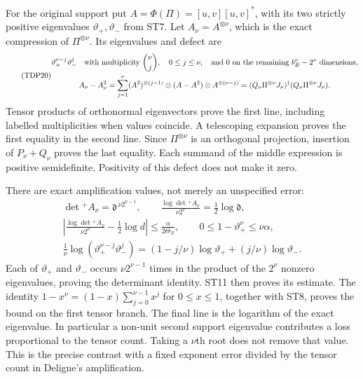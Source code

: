 For the original support put $A=\Phi(\Pi)=[u,v][u,v]^*$, with its two
strictly positive eigenvalues $\vartheta_+,\vartheta_-$ from ST7. Let
$A_\nu=A^{\otimes\nu}$, which is the exact compression of
$\Pi^{\otimes\nu}$. Its eigenvalues and defect are
\begin{equation}\tag{TDP20}
\begin{gathered}
\vartheta_+^{\nu-j}\vartheta_-^j
 \quad\hbox{with multiplicity }{\nu\choose j},\quad 0\le j\le\nu,
 \quad\hbox{and }0\hbox{ on the remaining }b_B^\nu-2^\nu\hbox{ dimensions},\\
A_\nu-A_\nu^2
 =\sum_{j=1}^{\nu}(A^2)^{\otimes(j-1)}\otimes(A-A^2)
 \otimes A^{\otimes(\nu-j)}
 =(Q_\nu\Pi^{\otimes\nu}J_\nu)^\dagger
  (Q_\nu\Pi^{\otimes\nu}J_\nu).
\end{gathered}
\end{equation}
Tensor products of orthonormal eigenvectors prove the first line,
including labelled multiplicities when values coincide. A telescoping
expansion proves the first equality in the second line. Since
$\Pi^{\otimes\nu}$ is an orthogonal projection, insertion of
$P_\nu+Q_\nu$ proves the last equality. Each summand of the middle
expression is positive semidefinite. Positivity of this defect does
not make it zero.

There are exact amplification values, not merely an unspecified error:
\begin{equation}\tag{TDP21}
\begin{gathered}
\det{}^+A_\nu=\mathfrak d^{\,\nu2^{\nu-1}},\qquad
\frac{\log\det{}^+A_\nu}{\nu2^\nu}=\tfrac12\log\mathfrak d,\\
\left|\frac{\log\det{}^+A_\nu}{\nu2^\nu}
 -\tfrac12\log d\right|\le\frac{\alpha}{2\Theta_N},\qquad
0\le1-\vartheta_+^\nu\le\nu\alpha,\\
\frac1\nu\log(\vartheta_+^{\nu-j}\vartheta_-^j)
 =(1-j/\nu)\log\vartheta_++(j/\nu)\log\vartheta_-.
\end{gathered}
\end{equation}
Each of $\vartheta_+$ and $\vartheta_-$ occurs $\nu2^{\nu-1}$ times in
the product of the $2^\nu$ nonzero eigenvalues, proving the determinant
identity. ST11 then proves its estimate. The identity
$1-x^\nu=(1-x)\sum_{j=0}^{\nu-1}x^j$ for $0\le x\le1$, together with
ST8, proves the bound on the first tensor branch. The final line is the
logarithm of the exact eigenvalue. In particular a non-unit second
support eigenvalue contributes a loss proportional to the tensor
count. Taking a $\nu$th root does not remove that value. This is the
precise contrast with a fixed exponent error divided by the tensor
count in Deligne's amplification.

